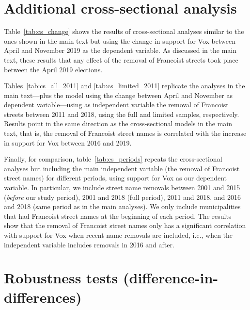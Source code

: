 \documentclass[12pt, titlepage]{article}
\begin{document}
\clearpage
\section{Additional cross-sectional analysis}\label{app:additional_cs}

Table~\ref{tab:cs_change} shows the results of cross-sectional analyses similar to the ones shown in the main text but using the change in support for Vox between April and November 2019 as the dependent variable.
As discussed in the main text, these results that any effect of the removal of Francoist streets took place between the April 2019 elections.



Tables~\ref{tab:cs_all_2011} and \ref{tab:cs_limited_2011} replicate the analyses in the main text---plus the model using the change between April and November as dependent variable---using as independent variable the removal of Francoist streets between 2011 and 2018, using the full and limited samples, respectively.
Results point in the same direction as the cross-sectional models in the main text, that is, the removal of Francoist street names is correlated with the increase in support for Vox between 2016 and 2019.




Finally, for comparison, table~\ref{tab:cs_periods} repeats the cross-sectional analyses but including the main independent variable (the removal of Francoist street names) for different periods, using support for Vox as our dependent variable.
In particular, we include street name removals between 2001 and 2015 (\textit{before} our study period), 2001 and 2018 (full period), 2011 and 2018, and 2016 and 2018 (same period as in the main analyses).
We only include municipalities that had Francoist street names at the beginning of each period.
The results show that the removal of Francoist street names only has a significant correlation with support for Vox when recent name removals are included, i.e., when the independent variable includes removals in 2016 and after.



\clearpage
\section{Robustness tests (difference-in-differences)}\label{app:robustness_did}
\end{document}
